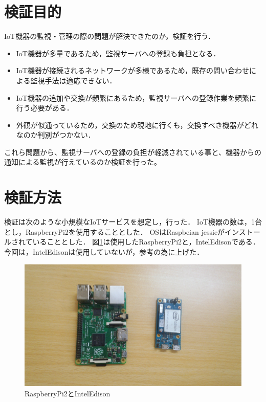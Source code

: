 \section{検証目的}
IoT機器の監視・管理の際の問題が解決できたのか，検証を行う．
\begin{itemize}
\item IoT機器が多量であるため，監視サーバへの登録も負担となる．
\item IoT機器が接続されるネットワークが多様であるため，既存の問い合わせによる監視手法は適応できない．
\item IoT機器の追加や交換が頻繁にあるため，監視サーバへの登録作業を頻繁に行う必要がある．
\item 外観が似通っているため，交換のため現地に行くも，交換すべき機器がどれなのか判別がつかない．
\end{itemize}
これら問題から、監視サーバへの登録の負担が軽減されている事と、機器からの通知による監視が行えているのか検証を行った。

\section{検証方法}
検証は次のような小規模なIoTサービスを想定し，行った．
IoT機器の数は，1台とし，RaspberryPi2を使用することとした．
OSはRaspbeian jessieがインストールされていることとした．
図\ref{fig:device}は使用したRaspberryPi2と，IntelEdisonである．
今回は，IntelEdisonは使用していないが，参考の為に上げた．
\begin{figure}[htbp]
\begin{center}
\includegraphics[width=14cm]{images/device.png}
\caption{RaspberryPi2とIntelEdison}
\label{fig:device}
\end{center}
\end{figure}

